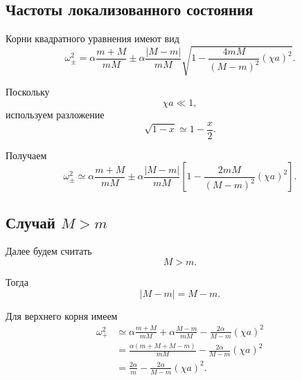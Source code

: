 \documentclass[../final.tex]{subfiles}
\begin{document}
\subsection*{Частоты локализованного состояния}

Корни квадратного уравнения имеют вид
%
\begin{equation*}
    \omega_\pm^2
    =
    \alpha
    \frac{m+M}{mM}
    \pm
    \alpha
    \frac{|M-m|}{mM}
    \sqrt{
        1
        -
        \frac{4mM}{(M-m)^2}
        (\chi a)^2
    }.
\end{equation*}
%

Поскольку
%
\begin{equation*}
    \chi a\ll1,
\end{equation*}
%
используем разложение
%
\begin{equation*}
    \sqrt{1-x}
    \simeq
    1-\frac{x}{2}.
\end{equation*}
%

Получаем
%
\begin{equation*}
    \omega_\pm^2
    \simeq
    \alpha
    \frac{m+M}{mM}
    \pm
    \alpha
    \frac{|M-m|}{mM}
    \left[
        1
        -
        \frac{2mM}{(M-m)^2}
        (\chi a)^2
    \right].
\end{equation*}



\subsection*{Случай $M>m$}

Далее будем считать
%
\begin{equation*}
    M>m.
\end{equation*}
%

Тогда
%
\begin{equation*}
    |M-m|
    =
    M-m.
\end{equation*}
%

Для верхнего корня имеем
%
\begin{align*}
    \omega_+^2
    &\simeq
    \alpha
    \frac{m+M}{mM}
    +
    \alpha
    \frac{M-m}{mM}
    -
    \frac{2\alpha}{M-m}
    (\chi a)^2
    \\
    &=
    \frac{
        \alpha(m+M+M-m)
    }{
        mM
    }
    -
    \frac{2\alpha}{M-m}
    (\chi a)^2
    \\
    &=
    \frac{2\alpha}{m}
    -
    \frac{2\alpha}{M-m}
    (\chi a)^2.
\end{align*}
%
\end{document}
